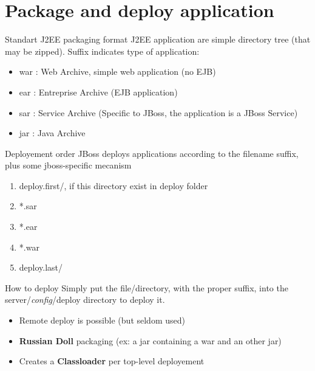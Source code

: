 \documentclass[handout]{beamer}
\begin{document}
\section{Package and deploy application}
	\begin{frame}
	 	\begin{block}{Standart J2EE packaging format}
	 	 	J2EE application are simple directory tree (that may be zipped). Suffix indicates type of application:
			\begin{itemize}
				\item war : Web Archive, simple web application (no EJB)
				\item ear : Entreprise Archive (EJB application)
				\item sar : Service Archive (Specific to JBoss, the application is a JBoss Service)
				\item jar : Java Archive
			\end{itemize}
	 	\end{block}
	\end{frame}
	\begin{frame}
	 	\begin{block}{Deployement order}
			JBoss deploys applications according to the filename suffix, plus some jboss-specific mecanism
			\begin{enumerate}
				\item deploy.first/, if this directory exist in deploy folder
				\item *.sar 
				\item *.ear
				\item *.war
				\item deploy.last/
			\end{enumerate}
		\end{block}
	\end{frame}
	\begin{frame}
		\begin{block}{How to deploy}
			Simply put the file/directory, with the proper suffix, into the server/\textit{config}/deploy directory to deploy it.
			\begin{itemize}
				\item Remote deploy is possible (but seldom used)
				\item \textbf{Russian Doll} packaging (ex: a jar containing a war and an other jar)
				\item Creates a \textbf{Classloader} per top-level deployement
			\end{itemize}
		\end{block}
	\end{frame}
\end{document}
